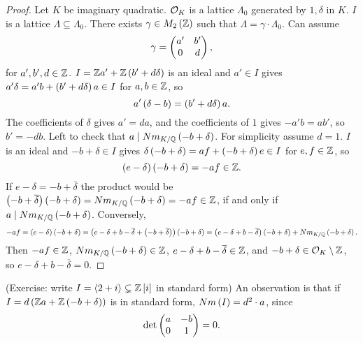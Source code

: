 \begin{proof}
Let $ K $ be imaginary quadratic. $ \mathcal{O}_K $ is a lattice $ \Lambda_0 $ generated by $ 1, \delta $ in $ K $. $ I $ is a lattice $ \Lambda \subseteq \Lambda_0 $. There exists $ \gamma \in M_2\left( \mathbb{Z} \right) $ such that $ \Lambda = \gamma \cdot \Lambda_0 $. Can assume
$$ \gamma = \begin{pmatrix} a' & b' \\ 0 & d \end{pmatrix}, $$
for $ a', b', d \in \mathbb{Z} $. $ I = \mathbb{Z} a' + \mathbb{Z}\left( b' + d\delta \right) $ is an ideal and $ a' \in I $ gives $ a'\delta = a'b + \left( b' + d\delta \right)a \in I $ for $ a, b \in \mathbb{Z} $, so
$$ a'\left( \delta - b \right) = \left( b' + d\delta \right)a. $$
The coefficients of $ \delta $ gives $ a' = da $, and the coefficients of $ 1 $ gives $ -a'b = ab' $, so $ b' = -db $. Left to check that $ a \mid Nm_{K / \mathbb{Q}}\left( -b + \delta \right) $. For simplicity assume $ d = 1 $. $ I $ is an ideal and $ -b + \delta \in I $ gives $ \delta\left( -b + \delta \right) = af + \left( -b + \delta \right)e \in I $ for $ e, f \in \mathbb{Z} $, so
$$ \left( e - \delta \right)\left( -b + \delta \right) = -af \in \mathbb{Z}. $$
If $ e - \delta = -b + \overline{\delta} $ the product would be $ \left( -b + \overline{\delta} \right)\left( -b + \delta \right) = Nm_{K / \mathbb{Q}}\left( -b + \delta \right) = -af \in \mathbb{Z} $, if and only if $ a \mid Nm_{K / \mathbb{Q}}\left( -b + \delta \right) $. Conversely,
$$ -af = \left( e - \delta \right)\left( -b + \delta \right) = \left( e - \delta + b - \overline{\delta} + \left( -b + \overline{\delta} \right) \right)\left( -b + \delta \right) = \left( e - \delta + b - \overline{\delta} \right)\left( -b + \delta \right) + Nm_{K / \mathbb{Q}}\left( -b + \delta \right). $$
Then $ -af \in \mathbb{Z} $, $ Nm_{K / \mathbb{Q}}\left( -b + \delta \right) \in \mathbb{Z} $, $ e - \delta + b - \overline{\delta} \in \mathbb{Z} $, and $ -b + \delta \in \mathcal{O}_K \setminus \mathbb{Z} $, so $ e - \delta + b - \overline{\delta} = 0 $.
\end{proof}

(Exercise: write $ I = \left\langle 2 + i \right\rangle \subsetneq \mathbb{Z}\left[ i \right] $ in standard form) An observation is that if $ I = d\left( \mathbb{Z} a + \mathbb{Z}\left( -b + \delta \right) \right) $ is in standard form, $ Nm\left( I \right) = d^2 \cdot a $, since
$$ \det\begin{pmatrix} a & -b \\ 0 & 1 \end{pmatrix} = 0. $$


